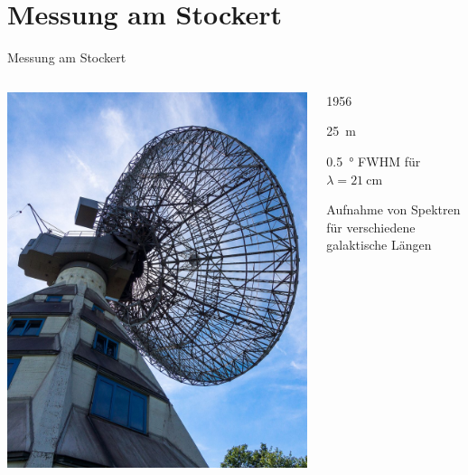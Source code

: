 \section{Messung am Stockert}
\begin{frame}{Messung am Stockert}
  \begin{columns}[c, onlytextwidth]
    \begin{column}{0.4\textwidth}
      \includegraphics[width=\linewidth]{images/stockert_crop.jpg}
    \end{column}
    \begin{column}{0.55\textwidth}
      \begin{description}[Durchmesser]
        \item[Baujahr] 1956
        \item[Durchmesser] \SI{25}{\meter}
        \item[Auflösung]  \SI{0.5}{\degree} FWHM für $λ = \SI{21}{\centi\meter}$
        \item[Messung] Aufnahme von Spektren für verschiedene galaktische Längen
      \end{description}
    \end{column}
  \end{columns}
\end{frame}

